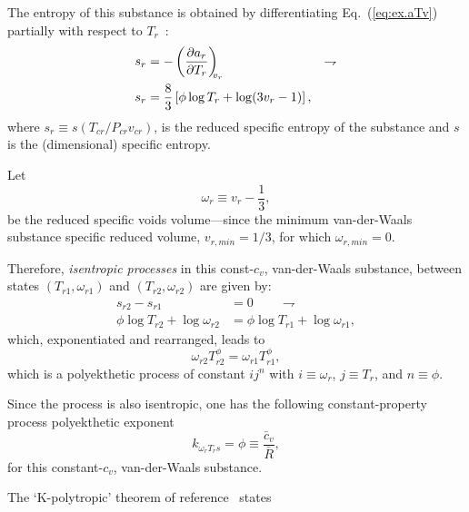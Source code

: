     The entropy of this substance is obtained by differentiating Eq.~(\ref{eq:ex.aTv}) partially
    with respect to $T_r$~\cite{1986-JonesJB+HawkinsGA-Wiley}:
    \begin{align}
        s_r & = -\left(\frac{\partial {{a_r}}}{\partial {{T_r}}}\right)_{\!\!\!{v_r}} & \rightharpoondown\\
        s_r & = \frac{8}{3}\left[\phi\log T_r + \log(3v_r - 1)\right], \label{eq:ex.sTv}
    \end{align}
    \noindent where $s_r \equiv s(T_{cr} / P_{cr}v_{cr})$, is the reduced  specific  entropy  of
    the substance and $s$ is the (dimensional) specific entropy.

    Let
    \begin{equation}
        \omega_r \equiv v_r - \frac{1}{3},
        \label{eq:def.omega}
    \end{equation}
    \noindent be the reduced specific voids volume---since the minimum  van-der-Waals  substance
    specific reduced volume, $v_{r,min} = 1/3$, for which $\omega_{r,min} = 0$.

    Therefore, \emph{isentropic processes} in this const-$c_v$, van-der-Waals substance, between
    states $(T_{r1}, \omega_{r1})$ and $(T_{r2}, \omega_{r2})$ are given by:
    \begin{align}
        s_{r2} - s_{r1} & = 0 \qquad\rightharpoondown\\
        \phi\log T_{r2} + \log\omega_{r2} & = \phi\log T_{r1} + \log\omega_{r1},
    \end{align}
    \noindent which, exponentiated and rearranged, leads to
    \begin{equation}
        \omega_{r2}T_{r2}^{\phi} = \omega_{r1}T_{r1}^{\phi},
        \label{eq:vdW.polyek}
    \end{equation}
    \noindent which is a polyekthetic process of constant $ij^n$ with $i  \equiv  \omega_r$,  $j
    \equiv T_r$, and $n \equiv \phi$.

    Since the process is also  isentropic,  one  has  the  following  constant-property  process
    polyekthetic exponent
    \begin{equation}
        k_{\omega_rT_rs} = \phi \equiv \frac{\bar{c}_v}{\bar{R}},
        \label{eq:vdW.kwTs}
    \end{equation}
    \noindent for this constant-$c_v$, van-der-Waals substance.

    The `K-polytropic' theorem of reference~\cite[p.~8]{2020-NaaktgeborenC-engrXiv} states

